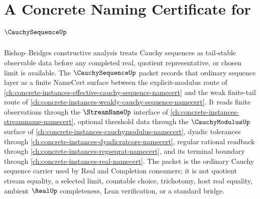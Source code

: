 \chapter{A Concrete Naming Certificate for $\CauchySequenceUp$}
\label{ch:concrete-instances-cauchy-sequence-namecert}

Bishop--Bridges constructive analysis treats Cauchy sequences as tail-stable observable data before any completed real, quotient representative, or chosen limit is available. The $\CauchySequenceUp$ packet records that ordinary sequence layer as a finite NameCert surface between the explicit-modulus route of \autoref{ch:concrete-instances-effective-cauchy-sequence-namecert} and the weak finite-tail route of \autoref{ch:concrete-instances-weakly-cauchy-sequence-namecert}. It reads finite observations through the $\StreamNameUp$ interface of \autoref{ch:concrete-instances-streamname-namecert}, optional threshold data through the $\CauchyModulusUp$ surface of \autoref{ch:concrete-instances-cauchymodulus-namecert}, dyadic tolerances through \autoref{ch:concrete-instances-dyadicratcore-namecert}, regular rational readback through \autoref{ch:concrete-instances-regseqrat-namecert}, and its terminal boundary through \autoref{ch:concrete-instances-real-namecert}. The packet is the ordinary Cauchy sequence carrier used by Real and Completion consumers; it is not quotient stream equality, a selected limit, countable choice, trichotomy, host real equality, ambient $\RealUp$ completeness, Lean verification, or a standard bridge.

